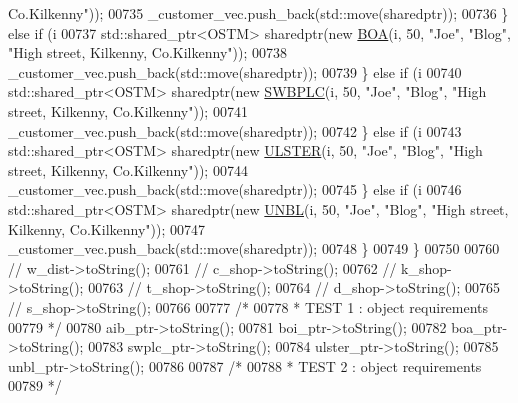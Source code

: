 \begin{DoxyCode}
{       Co.Kilkenny"}));
00735             \_customer\_vec.push\_back(std::move(sharedptr));
00736         \} \textcolor{keywordflow}{else} \textcolor{keywordflow}{if} (i %
00737             std::shared\_ptr<OSTM> sharedptr(\textcolor{keyword}{new} \hyperlink{class_b_o_a}{BOA}(i, 50, \textcolor{stringliteral}{"Joe"}, \textcolor{stringliteral}{"Blog"}, \textcolor{stringliteral}{"High street, Kilkenny,
       Co.Kilkenny"}));
00738             \_customer\_vec.push\_back(std::move(sharedptr));
00739         \} \textcolor{keywordflow}{else} \textcolor{keywordflow}{if} (i %
00740             std::shared\_ptr<OSTM> sharedptr(\textcolor{keyword}{new} \hyperlink{class_s_w_b_p_l_c}{SWBPLC}(i, 50, \textcolor{stringliteral}{"Joe"}, \textcolor{stringliteral}{"Blog"}, \textcolor{stringliteral}{"High street, Kilkenny,
       Co.Kilkenny"}));
00741             \_customer\_vec.push\_back(std::move(sharedptr));
00742         \} \textcolor{keywordflow}{else} \textcolor{keywordflow}{if} (i %
00743             std::shared\_ptr<OSTM> sharedptr(\textcolor{keyword}{new} \hyperlink{class_u_l_s_t_e_r}{ULSTER}(i, 50, \textcolor{stringliteral}{"Joe"}, \textcolor{stringliteral}{"Blog"}, \textcolor{stringliteral}{"High street, Kilkenny,
       Co.Kilkenny"}));
00744             \_customer\_vec.push\_back(std::move(sharedptr));
00745         \} \textcolor{keywordflow}{else} \textcolor{keywordflow}{if} (i %
00746             std::shared\_ptr<OSTM> sharedptr(\textcolor{keyword}{new} \hyperlink{class_u_n_b_l}{UNBL}(i, 50, \textcolor{stringliteral}{"Joe"}, \textcolor{stringliteral}{"Blog"}, \textcolor{stringliteral}{"High street, Kilkenny,
       Co.Kilkenny"}));
00747             \_customer\_vec.push\_back(std::move(sharedptr));
00748         \}
00749     \}
00750 
00760     \textcolor{comment}{//    w\_dist->toString();}
00761     \textcolor{comment}{//    c\_shop->toString();}
00762     \textcolor{comment}{//    k\_shop->toString();}
00763     \textcolor{comment}{//    t\_shop->toString();}
00764     \textcolor{comment}{//    d\_shop->toString();}
00765     \textcolor{comment}{//    s\_shop->toString();}
00766 
00777     \textcolor{comment}{/*}
00778 \textcolor{comment}{     * TEST 1 : object requirements}
00779 \textcolor{comment}{     */}
00780     aib\_ptr->toString();
00781     boi\_ptr->toString();
00782     boa\_ptr->toString();
00783     swplc\_ptr->toString();
00784     ulster\_ptr->toString();
00785     unbl\_ptr->toString();
00786 
00787     \textcolor{comment}{/*}
00788 \textcolor{comment}{     * TEST 2 : object requirements }
00789 \textcolor{comment}{     */}

\end{DoxyCode}
